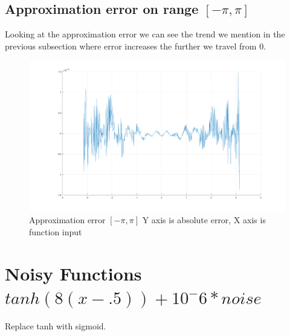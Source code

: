 \documentclass{article}
\begin{document}
\subsection{Approximation error on range $[-\pi, \pi]$ }
Looking at the approximation error we can see the trend we mention in the previous subsection where error increases the further we travel from 0.
\begin{figure}[h!]
\centering
\includegraphics[scale=.2]{approxerror.png}
\caption{Approximation error  $[-\pi, \pi]$ Y axis is absolute error, X axis is function input}
\label{fig:approxerror}
\end{figure}

\section{Noisy Functions $tanh(8(x-.5)) + 10^-6*noise$}
Replace tanh with sigmoid.
\end{document}

